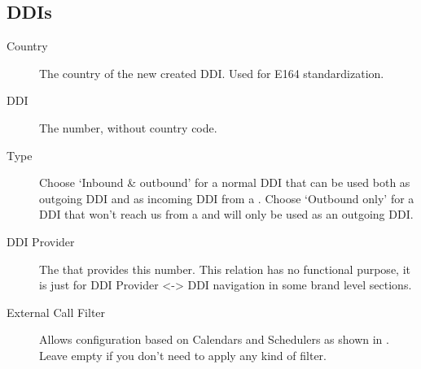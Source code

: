 \documentclass[letterpaper,10pt,english]{sphinxmanual}
\begin{document}
\subsection{DDIs}
\label{administration_portal/client/vpbx/ddis:ddis}\label{administration_portal/client/vpbx/ddis::doc}\label{administration_portal/client/vpbx/ddis:pbx-ddis}\begin{description}
\item[{Country}] \leavevmode{}\label{administration_portal/client/vpbx/ddis:term-country}
The country of the new created DDI. Used for E164 standardization.

\item[{DDI}] \leavevmode{}\label{administration_portal/client/vpbx/ddis:term-ddi}
The number, without country code.

\item[{Type}] \leavevmode{}\label{administration_portal/client/vpbx/ddis:term-type}
Choose `Inbound \& outbound' for a normal DDI that can be used both as outgoing DDI and as incoming DDI
from a {\hyperref[administration_portal/brand/providers/ddi_providers:ddi\string-providers]{}}. Choose `Outbound only' for a DDI that won't reach us from a
{\hyperref[administration_portal/brand/providers/ddi_providers:ddi\string-providers]{}} and will only be used as an outgoing DDI.

\item[{DDI Provider}] \leavevmode{}\label{administration_portal/client/vpbx/ddis:term-ddi-provider}
The {\hyperref[administration_portal/brand/providers/ddi_providers:ddi\string-providers]{}} that provides this number. This relation has no functional purpose, it
is just for DDI Provider \textless{}-\textgreater{} DDI navigation in some brand level sections.

\item[{External Call Filter}] \leavevmode{}\label{administration_portal/client/vpbx/ddis:term-external-call-filter}
Allows configuration based on Calendars and Schedulers as shown in
{\hyperref[administration_portal/client/vpbx/routing_tools/external_call_filters:external\string-call\string-filters]{}}. Leave empty if you don't need to apply any
kind of filter.


\end{description}
\end{document}
